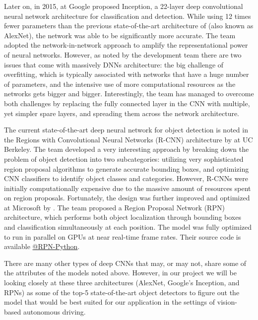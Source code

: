 Later on, in 2015, \cite{Google-Inception} at Google proposed Inception, a 22-layer deep convolutional neural network architecture for classification and detection. While using 12 times fewer parameters than the previous state-of-the-art architecture of \cite{AlexNet} (also known as AlexNet), the network was able to be significantly more accurate. The team adopted the network-in-network approach to amplify the representational power of neural networks. However, as noted by the development team there are two issues that come with massively DNNs architecture: the big challenge of overfitting, which is typically associated with networks that have a huge number of parameters, and the intensive use of more computational resources as the networks gets bigger and bigger. Interestingly, the team has managed to overcome both challenges by replacing the fully connected layer in the CNN with multiple, yet simpler spare layers, and spreading them across the network architecture. 
\par
The current state-of-the-art deep neural network for object detection is noted in the Regions with Convolutional Neural Networks (R-CNN) architecture by \cite{R-CNN} at UC Berkeley. The team developed a very interesting approach by breaking down the problem of object detection into two subcategories: utilizing very sophisticated region proposal algorithms to generate accurate bounding boxes, and optimizing CNN classifiers to identify object classes and categories. However, R-CNNs were initially computationally expensive due to the massive amount of resources spent on region proposals. Fortunately, the design was further improved and optimized at Microsoft by \cite{RPN}. The team proposed a Region Proposal Network (RPN) architecture, which performs both object localization through bounding boxes and classification simultaneously at each position. The model was fully optimized to run in parallel on GPUs at near real-time frame rates. Their source code is available \href{https://github.com/rbgirshick/py-faster-rcnn}{@RPN-Python}. 
\par
There are many other types of deep CNNs that may, or may not, share some of the attributes of the models noted above. However, in our project we will be looking closely at these three architectures (AlexNet, Google's Inception, and RPNs) as some of the top-5 state-of-the-art object detectors to figure out the model that would be best suited for our application in the settings of vision-based autonomous driving. \cite{Speed-accuracy-trade-offs}  
\par\bigskip



